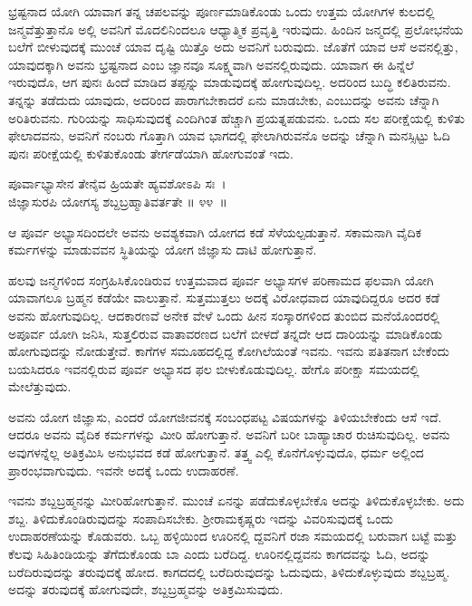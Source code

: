 ಭ್ರಷ್ಟನಾದ ಯೋಗಿ ಯಾವಾಗ ತನ್ನ ಚಪಲವನ್ನು ಪೂರ್ಣಮಾಡಿಕೊಂಡು ಒಂದು ಉತ್ತಮ ಯೋಗಿಗಳ ಕುಲದಲ್ಲಿ ಜನ್ಮವೆತ್ತುತ್ತಾನೊ ಅಲ್ಲಿ ಅವನಿಗೆ ಮೊದಲಿನಿಂದಲೂ ಆಧ್ಯಾತ್ಮಿಕ ಪ್ರವೃತ್ತಿ ಇರುವುದು. ಹಿಂದಿನ ಜನ್ಮದಲ್ಲಿ ಪ್ರಲೋಭನೆಯ ಬಲೆಗೆ ಬೀಳುವುದಕ್ಕೆ ಮುಂಚೆ ಯಾವ ದೃಷ್ಟಿ ಯಿತ್ತೊ ಅದು ಅವನಿಗೆ ಬರುವುದು. ಜೊತೆಗೆ ಯಾವ ಆಸೆ ಅವನಲ್ಲಿತ್ತು, ಯಾವುದಕ್ಕಾಗಿ ಅವನು ಭ್ರಷ್ಟನಾದ ಎಂಬ ಜ್ಞಾನವೂ ಸೂಕ್ಷ್ಮವಾಗಿ ಅವನಲ್ಲಿರುವುದು. ಯಾವಾಗ ಈ ಹಿನ್ನೆಲೆ ಇರುವುದೊ, ಆಗ ಪುನಃ ಹಿಂದೆ ಮಾಡಿದ ತಪ್ಪನ್ನು ಮಾಡುವುದಕ್ಕೆ ಹೋಗುವುದಿಲ್ಲ. ಅದರಿಂದ ಬುದ್ಧಿ ಕಲಿತಿರುವನು. ತನ್ನನ್ನು ತಡೆದುದು ಯಾವುದು, ಅದರಿಂದ ಪಾರಾಗಬೇಕಾದರೆ ಏನು ಮಾಡಬೇಕು, ಎಂಬುದನ್ನು ಅವನು ಚೆನ್ನಾಗಿ ಅರಿತಿರುವನು. ಗುರಿಯನ್ನು ಸಾಧಿಸುವುದಕ್ಕೆ ಎಂದಿಗಿಂತ ಹೆಚ್ಚಾಗಿ ಪ್ರಯತ್ನಪಡುವನು. ಒಂದು ಸಲ ಪರೀಕ್ಷೆಯಲ್ಲಿ ಕುಳಿತು ಫೇಲಾದವನು, ಅವನಿಗೆ ನಂಬರು ಗೊತ್ತಾಗಿ ಯಾವ ಭಾಗದಲ್ಲಿ ಫೇಲಾಗಿರುವನೊ ಅದನ್ನು ಚೆನ್ನಾಗಿ ಮನಸ್ಸಿಟ್ಟು ಓದಿ ಪುನಃ ಪರೀಕ್ಷೆಯಲ್ಲಿ ಕುಳಿತುಕೊಂಡು ತೇರ್ಗಡೆಯಾಗಿ ಹೋಗುವಂತೆ ಇದು.

\begin{shloka}
ಪೂರ್ವಾಭ್ಯಾಸೇನ ತೇನೈವ ಹ್ರಿಯತೇ ಹ್ಯವಶೋಽಪಿ ಸಃ~।\\ಜಿಜ್ಞಾಸುರಪಿ ಯೋಗಸ್ಯ ಶಬ್ದಬ್ರಹ್ಮಾತಿವರ್ತತೇ \hfill॥ ೪೪~॥
\end{shloka}

\begin{artha}
ಆ ಪೂರ್ವ ಅಭ್ಯಾಸದಿಂದಲೇ ಅವನು ಅವಶ್ಯಕವಾಗಿ ಯೋಗದ ಕಡೆ ಸೆಳೆಯಲ್ಪಡುತ್ತಾನೆ. ಸಕಾಮನಾಗಿ ವೈದಿಕ ಕರ್ಮಗಳನ್ನು ಮಾಡುವವನ ಸ್ಥಿತಿಯನ್ನು ಯೋಗ ಜಿಜ್ಞಾಸು ದಾಟಿ ಹೋಗುತ್ತಾನೆ.
\end{artha}

ಹಲವು ಜನ್ಮಗಳಿಂದ ಸಂಗ್ರಹಿಸಿಕೊಂಡಿರುವ ಉತ್ತಮವಾದ ಪೂರ್ವ ಅಭ್ಯಾಸಗಳ ಪರಿಣಾಮದ ಫಲವಾಗಿ ಯೋಗಿ ಯಾವಾಗಲೂ ಬ್ರಹ್ಮನ ಕಡೆಯೇ ವಾಲುತ್ತಾನೆ. ಸುತ್ತಮುತ್ತಲು ಅದಕ್ಕೆ ವಿರೋಧವಾದ ಯಾವುದಿದ್ದರೂ ಅದರ ಕಡೆ ಅವನು ಹೋಗುವುದಿಲ್ಲ. ಆದಕಾರಣವೆ ಅನೇಕ ವೇಳೆ ಒಂದು ಹೀನ ಸಂಸ್ಕಾರಗಳಿಂದ ತುಂಬಿದ ಮನೆಯೊಂದರಲ್ಲಿ ಅಪೂರ್ವ ಯೋಗಿ ಜನಿಸಿ, ಸುತ್ತಲಿರುವ ವಾತಾವರಣದ ಬಲೆಗೆ ಬೀಳದೆ ತನ್ನದೇ ಆದ ದಾರಿಯನ್ನು ಮಾಡಿಕೊಂಡು ಹೋಗುವುದನ್ನು ನೋಡುತ್ತೇವೆ. ಕಾಗೆಗಳ ಸಮೂಹದಲ್ಲಿದ್ದ ಕೋಗಿಲೆಯಂತೆ ಇವನು. ಇವನು ಪತಿತನಾಗ ಬೇಕೆಂದು ಬಯಸಿದರೂ ಇವನಲ್ಲಿರುವ ಪೂರ್ವ ಅಭ್ಯಾಸದ ಫಲ ಬೀಳುಕೊಡುವುದಿಲ್ಲ. ಹೇಗೊ ಪರೀಕ್ಷಾ ಸಮಯದಲ್ಲಿ ಮೇಲೆತ್ತುವುದು.

ಅವನು ಯೋಗ ಜಿಜ್ಞಾಸು, ಎಂದರೆ ಯೋಗಜೀವನಕ್ಕೆ ಸಂಬಂಧಪಟ್ಟ ವಿಷಯಗಳನ್ನು ತಿಳಿಯಬೇಕೆಂದು ಆಸೆ ಇದೆ. ಆದರೂ ಅವನು ವೈದಿಕ ಕರ್ಮಗಳನ್ನು ಮೀರಿ ಹೋಗುತ್ತಾನೆ. ಅವನಿಗೆ ಬರೀ ಬಾಹ್ಯಾಚಾರ ರುಚಿಸುವುದಿಲ್ಲ. ಅವನು ಅವುಗಳನ್ನೆಲ್ಲ ಅತಿಕ್ರಮಿಸಿ ಅನುಭವದ ಕಡೆ ಹೋಗುತ್ತಾನೆ. ತತ್ತ್ವ ಎಲ್ಲಿ ಕೊನೆಗೊಳ್ಳುವುದೊ, ಧರ್ಮ ಅಲ್ಲಿಂದ ಪ್ರಾರಂಭವಾಗುವುದು. ಇವನೇ ಅದಕ್ಕೆ ಒಂದು ಉದಾಹರಣೆ.

ಇವನು ಶಬ್ದಬ್ರಹ್ಮನನ್ನು ಮೀರಿಹೋಗುತ್ತಾನೆ. ಮುಂಚೆ ಏನನ್ನು ಪಡೆದುಕೊಳ್ಳಬೇಕೊ ಅದನ್ನು ತಿಳಿದುಕೊಳ್ಳಬೇಕು. ಅದು ಶಬ್ದ. ತಿಳಿದುಕೊಂಡಿರುವುದನ್ನು ಸಂಪಾದಿಸಬೇಕು. ಶ‍್ರೀರಾಮಕೃಷ್ಣರು ಇದನ್ನು ವಿವರಿಸುವುದಕ್ಕೆ ಒಂದು ಉದಾಹರಣೆಯನ್ನು ಕೊಡುವರು. ಒಬ್ಬ ಹಳ್ಳಿಯಿಂದ ಊರಿನಲ್ಲಿ ದ್ದವನಿಗೆ ರಜಾ ಸಮಯದಲ್ಲಿ ಬರುವಾಗ ಬಟ್ಟೆ ಮತ್ತು ಕೆಲವು ಸಿಹಿತಿಂಡಿಯನ್ನು ತೆಗೆದುಕೊಂಡು ಬಾ ಎಂದು ಬರೆದಿದ್ದ. ಊರಿನಲ್ಲಿದ್ದವನು ಕಾಗದವನ್ನು ಓದಿ, ಅದನ್ನು ಬರೆದಿರುವುದನ್ನು ತರುವುದಕ್ಕೆ ಹೋದ. ಕಾಗದದಲ್ಲಿ ಬರೆದಿರುವುದನ್ನು ಓದುವುದು, ತಿಳಿದು\-ಕೊಳ್ಳುವುದು ಶಬ್ದಬ್ರಹ್ಮ. ಅದನ್ನು ತರುವುದಕ್ಕೆ ಹೋಗುವುದೇ, ಶಬ್ದಬ್ರಹ್ಮವನ್ನು ಅತಿಕ್ರಮಿಸುವುದು.

